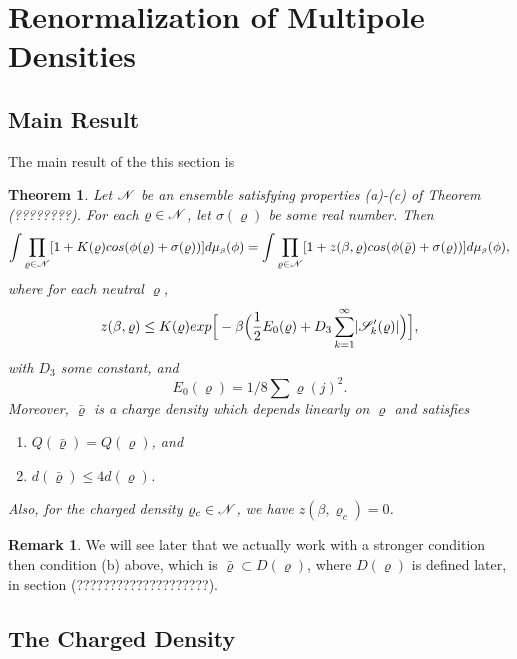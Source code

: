 \documentclass[11pt,reqno]{article}
\DeclarePairedDelimiter\abs{\lvert}{\rvert}%
\newtheorem{thm}{Theorem}[section]
\theoremstyle{definition}
\newtheorem*{remark}{Remark}
\numberwithin{equation}{section}
\begin{document}
\section{Renormalization of Multipole Densities}\label{sec:chap4}



\subsection{Main Result}
The main result of the this section is
\begin{thm} \label{thm:thm41}
Let $\mathscr{N}$ be an ensemble satisfying properties (a)-(c) of Theorem (????????). For each $\varrho \in \mathscr{N}$, let $\sigma(\varrho)$ be some real number. Then
\begin{equation}
\int\prod_{\varrho \in \mathscr{N}}[1 + K(\varrho)cos(\phi(\varrho) + \sigma(\varrho))]d\mu_{\text{\tiny$\beta$}}(\phi) = 
\int\prod_{\varrho \in \mathscr{N}}[1 + z(\beta,\varrho)cos(\phi(\bar{\varrho}) + \sigma(\varrho))]d\mu_{\text{\tiny$\beta$}}(\phi), 
\end{equation}
where for each neutral $\varrho$,
\begin{equation} \label{eqEloc}
z(\beta,\varrho) \leq K(\varrho)exp\Big[-\beta \Big(\frac{1}{2}E_0(\varrho) + D_3\sum_{k=1}^\infty \abs{\SqrsSetTagOf{k}{\varrho}}\Big)\Big],
\end{equation}
with $D_3$ some constant, and 
\begin{equation} \label{eqE0}
E_0(\varrho) = 1/8\sum\varrho(j)^2. 
\end{equation}
Moreover, $\bar{\varrho}$ is a charge density which depends linearly on $\varrho$ and satisfies
\begin{enumerate}[label={\alph*)}]
\item $Q(\bar{\varrho}) = Q(\varrho)$, and
\item $d(\bar{\varrho}) \leq 4d(\varrho)$.
\end{enumerate}
Also, for the charged density $\varrho_c \in \mathscr{N}$, we have $z(\beta, \varrho_c)=0$.
\end{thm}
\begin{remark}
We will see later that we actually work with a stronger condition then condition (b) above,  which is $\bar{\varrho} \subset D(\varrho)$, where $D(\varrho)$ is defined later, in section (????????????????????).
\end{remark}

\subsection{The Charged Density}
\end{document}
